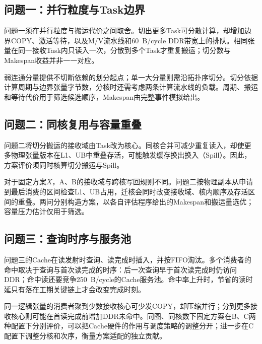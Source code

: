 \subsection{问题一：并行粒度与Task边界}
问题一须在并行粒度与搬运代价之间取舍。切出更多Task可分散计算，却增加边界COPY、激活等待，以及M/V流水线和60~B/cycle DDR带宽上的排队。相同张量在同一接收Task内只读入一次，分散到多个Task才重复搬运；切分数与Makespan收益并非一一对应。

弱连通分量提供不切断依赖的划分起点；单一大分量则需沿拓扑序切分。切分依据计算周期与边界张量字节数，分核时还需考虑两条计算流水线的负载。周期、搬运和等待代价用于筛选候选顺序，Makespan由完整事件模拟给出。

\subsection{问题二：同核复用与容量重叠}
问题二将切分搬运的接收域由Task改为核心。同核合并可减少重复读入，却使更多物理张量版本在L1、UB中重叠存活，可能触发缓存换出换入（Spill）。因此，方案评价须同时核算切分搬运与Spill。

对于固定方案$X$，A、B的接收域与跨核写回规则不同。问题二按物理副本从申请到最后消费的区间检查L1、UB占用，迁核会同时改变接收域、核内顺序及存活区间的重叠。两问分别构造方案，以各自评估程序给出的Makespan和搬运量选优；容量压力估计仅用于筛选。

\subsection{问题三：查询时序与服务池}
问题三的Cache在读发射时查询、读完成时插入，并按FIFO淘汰。多个消费者的命中取决于查询与首次读完成的时序：后一次查询早于首次读完成时仍访问DDR；命中读还要竞争250~B/cycle的Cache服务池。命中率上升时，节省的读时延只有落在工期关键链上才会改变完成时刻。

同一逻辑张量的消费者聚到少数接收核心可少发COPY，却压缩并行；分到更多接收核心则可能在首读完成前增加DDR未命中。同图、同核数下固定方案在B、C两种配置下分别评价，可以把Cache硬件的作用与调度策略的调整分开；进一步在C配置下调整分核和次序，衡量方案适配的独立贡献。
